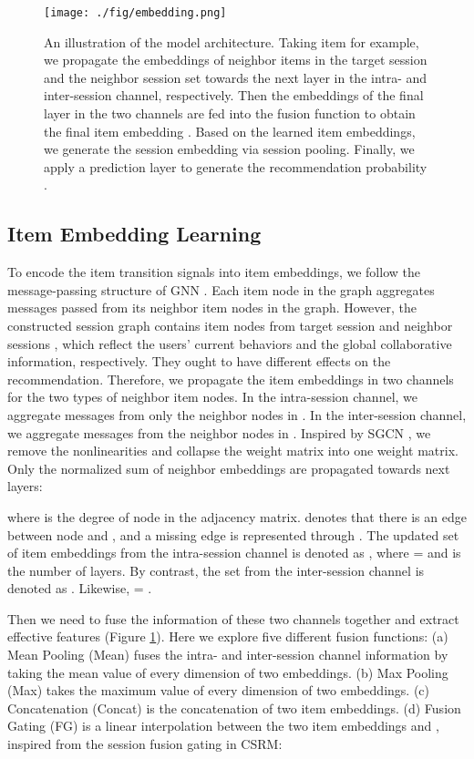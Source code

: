 \documentclass[conference]{IEEEtran}
\begin{document}
\begin{figure}[t]
\centering
\texttt{[image: ./fig/embedding.png]} \caption{An illustration of the model architecture. Taking item  for example, we propagate the embeddings of neighbor items in the target session  and the neighbor session set  towards the next layer in the intra- and inter-session channel, respectively. Then the embeddings of the final layer in the two channels are fed into the fusion function to obtain the final item embedding . Based on the learned item embeddings, we generate the session embedding via session pooling. Finally, we apply a prediction layer to generate the recommendation probability . 
}
\label{fig:embedding}
\vspace{-2mm}
\end{figure}

\subsection{Item Embedding Learning}
To encode the item transition signals into item embeddings, we follow the message-passing structure of GNN \cite{kipf2016semi}. Each item node  in the graph aggregates messages passed from its neighbor item nodes in the graph.
However, the constructed session graph contains item nodes from target session  and neighbor sessions , which reflect the users' current behaviors and the global collaborative information, respectively.
They ought to have different effects on the recommendation.
Therefore, we propagate the item embeddings in two channels for the two types of neighbor item nodes.
In the intra-session channel, we aggregate messages from only the neighbor nodes in .
In the inter-session channel, we aggregate messages from the neighbor nodes in .
Inspired by SGCN \cite{wu2019simplifying}, we remove the nonlinearities and collapse the weight matrix into one weight matrix. Only the normalized sum of neighbor embeddings are propagated towards next layers:

where  is the degree of node  in the adjacency matrix.  denotes that there is an edge between node  and , and a missing edge is represented through .
The updated set of item embeddings from the intra-session channel is denoted as , where  =  and  is the number of layers.
By contrast, the set from the inter-session channel is denoted as .
Likewise,  = . 


Then we need to fuse the information of these two channels together and extract effective features (Figure \ref{fig:embedding}). Here we explore five different fusion functions: (a) Mean Pooling (Mean) fuses the intra- and inter-session channel information by taking the mean value of every dimension of two embeddings.  (b) Max Pooling (Max) takes the maximum value of every dimension of two embeddings. (c) Concatenation (Concat) is the concatenation of two item embeddings. (d) Fusion Gating (FG) is a linear interpolation between the two item embeddings  and , inspired from the session fusion gating in CSRM:
\end{document}

